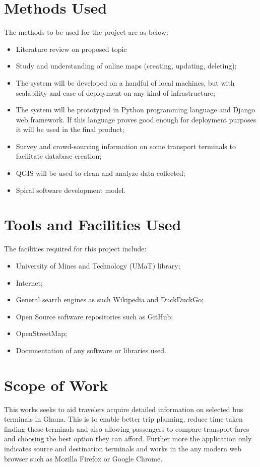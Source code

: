 \section{Methods Used}
The methods to be used for the project are as below:
\begin{itemize}
	\item Literature review on proposed topic
	\item Study and understanding of online maps (creating, updating, deleting);
	\item The system will be developed on a handful of local machines, but with scalability and ease of deployment on any kind of infrastructure;
	\item The system will be prototyped in Python programming language and Django web framework. If this language proves good enough for deployment purposes it will be used in the final product;
	\item Survey and crowd-sourcing information on some transport terminals to facilitate database creation;
	\item QGIS will be used to clean and analyze data collected;
	\item Spiral software development model.
\end{itemize}

\section{Tools and Facilities Used}
The facilities required for this project include:
\begin{itemize}
	\item University of Mines and Technology (UMaT) library;
	\item Internet;
	\item General search engines as such Wikipedia and DuckDuckGo;
	\item Open Source software repositories such as GitHub;
	\item OpenStreetMap;
	\item Documentation of any software or libraries used.
\end{itemize}

\section{Scope of Work}
This works seeks to aid travelers acquire detailed information on selected bus terminals in Ghana. This is to enable better trip planning, reduce time taken finding these terminals and also allowing passengers to compare transport fares and choosing the best option they can afford.
Further more the application only indicates source and destination terminals and works in the any modern web browser such as Mozilla Firefox or Google Chrome.


